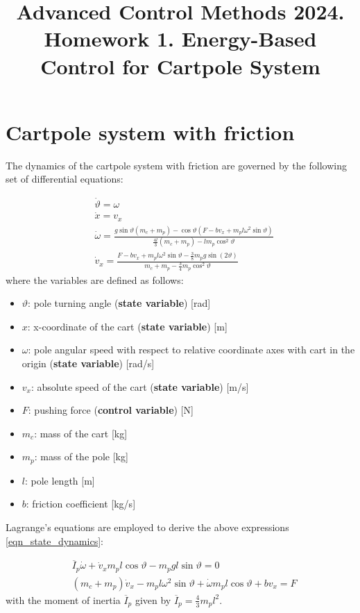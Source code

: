\documentclass[12pt]{article}
\title{Advanced Control Methods 2024. Homework 1. Energy-Based Control for Cartpole System}
\begin{document}
\section*{Cartpole system with friction}

The dynamics of the cartpole system with friction are governed by the following set of differential equations:

\begin{equation}
    \label{eqn_state_dynamics}
    \begin{aligned}
        &\dot{\vartheta} =  \omega \\
        &\dot{x} = v_x \\
        &\dot{\omega} =  \frac{g \sin{\vartheta}(m_c + m_p) - \cos{\vartheta}(F - b v_x + m_p l \omega^2 \sin{\vartheta})}{\frac{4l}{3}(m_c + m_p) - lm_p \cos^2{\vartheta}}\\
        &\dot{v}_x = \frac{F - b v_x + m_p l \omega ^2 \sin{\vartheta} - \frac{3}{8}m_p g\sin(2\vartheta)}{m_c + m_p - \frac{3}{4} m_p \cos ^ 2 \vartheta}
    \end{aligned}
\end{equation}
where the variables are defined as follows:
\begin{itemize}
\item $\vartheta$: pole turning angle (\textbf{state variable}) [rad]
\item $x$: x-coordinate of the cart (\textbf{state variable}) [m]
\item $\omega$: pole angular speed with respect to relative coordinate axes with cart in the origin (\textbf{state variable}) [rad/s]
\item $v_x$: absolute speed of the cart (\textbf{state variable}) [m/s]
\item $F$: pushing force (\textbf{control variable}) [N]
\item $m_c$: mass of the cart [kg]
\item $m_p$: mass of the pole [kg]
\item $l$: pole length [m]
\item $b$: friction coefficient [kg/s]  
\end{itemize}
Lagrange's equations are employed to derive the above expressions \eqref{eqn_state_dynamics}:

\begin{eqnarray}
\label{eqn_sum_moments}
& \overline{I}_p \dot{\omega} + \dot{v}_x m_p l\cos \vartheta  - m_p g l \sin \vartheta = 0 \\ 
\label{eqn_2nd_newton_law}
& (m_c + m_p) \dot{v}_x - m_p l \omega^2 \sin \vartheta + \dot{\omega} m_p l \cos \vartheta  + b v_x = F
\end{eqnarray}
with the moment of inertia $\overline{I}_p$ given by $\overline{I}_p  = \frac{4}{3}m_p l ^ 2 $.
\end{document}
